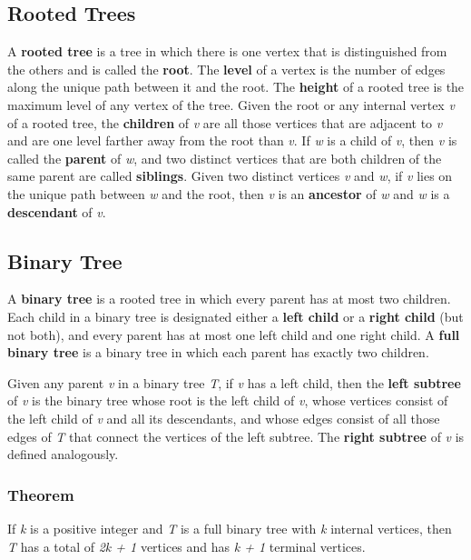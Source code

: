 \documentclass{article}
\begin{document}
\setcounter{section}{10}
\setcounter{subsection}{5}

\subsection{Rooted Trees}
A \textbf{rooted tree} is a tree in which there is one vertex that is distinguished from the others and is called the \textbf{root}. The \textbf{level} of a vertex is the number of edges along the unique path between it and the root. The \textbf{height} of a rooted tree is the maximum level of any vertex of the tree. Given the root or any internal vertex \textit{v} of a rooted tree, the \textbf{children} of \textit{v} are all those vertices that are adjacent to \textit{v} and are one level farther away from the root than \textit{v}. If \textit{w} is a child of \textit{v}, then \textit{v} is called the \textbf{parent} of \textit{w}, and two distinct vertices that are both children of the same parent are called \textbf{siblings}. Given two distinct vertices \textit{v} and \textit{w}, if \textit{v} lies on the unique path between \textit{w} and the root, then \textit{v} is an \textbf{ancestor} of \textit{w} and \textit{w} is a \textbf{descendant} of \textit{v}.

\subsection{Binary Tree}
A \textbf{binary tree} is a rooted tree in which every parent has at most two children. Each child in a binary tree is designated either a \textbf{left child} or a \textbf{right child} (but not both), and every parent has at most one left child and one right child. A \textbf{full binary tree} is a binary tree in which each parent has exactly two children.

Given any parent \textit{v} in a binary tree \textit{T}, if \textit{v} has a left child, then the \textbf{left subtree} of \textit{v} is the binary tree whose root is the left child of \textit{v}, whose vertices consist of the left child of \textit{v} and all its descendants, and whose edges consist of all those edges of \textit{T} that connect the vertices of the left subtree. The \textbf{right subtree} of \textit{v} is defined analogously.

\subsubsection{Theorem}
If \textit{k} is a positive integer and \textit{T} is a full binary tree with \textit{k} internal vertices, then \textit{T} has a total of \textit{2k + 1} vertices and has \textit{k + 1} terminal vertices.
\end{document}

